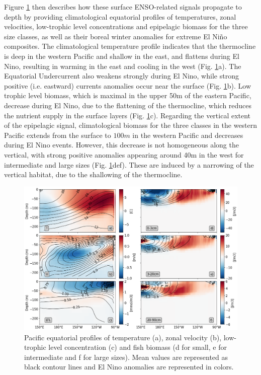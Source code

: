 Figure \ref{fig:profiles} then describes how these surface ENSO-related signals propagate to depth by providing climatological equatorial profiles of temperatures, zonal velocities, low-trophic level concentrations and  epipelagic biomass for the three size classes, as well as their boreal winter anomalies for extreme El Niño composites. The climatological temperature profile indicates that the thermocline is deep in the western Pacific and shallow in the east, and flattens during El Nino, resulting in warming in the east and cooling in the west (Fig. \ref{fig:profiles}a). The Equatorial Undercurrent also weakens strongly during El Nino, while strong positive (i.e. eastward) currents anomalies occur near the surface (Fig. \ref{fig:profiles}b). Low trophic level biomass, which is maximal in the upper 50m of the eastern Pacific, decrease during El Nino, due to the flattening of the thermocline, which reduces the nutrient supply in the surface layers (Fig. \ref{fig:profiles}c). Regarding the vertical extent of the epipelagic signal, climatological biomass for the three classes in the western Pacific extends from the surface to $100m$ in the western Pacific and decreases during El Nino events. However, this decrease is not homogeneous along the vertical, with strong positive anomalies appearing around 40m in the west for intermediate and large sizes (Fig. \ref{fig:profiles}def). These are induced by a narrowing of the vertical habitat, due to the shallowing of the thermocline. 

\begin{figure}[h!tp]
	\centering
	\includegraphics[scale=0.4]{figs/forage_mean_ond97.png}	
	\caption{Pacific equatorial profiles of temperature (a), zonal velocity (b), low-trophic level concentration (c) and fish biomass (d for small, e for intermediate and f for large sizes). Mean values are represented as black contour lines and El Nino anomalies are represented in colors.}	
	\label{fig:profiles}
\end{figure}


